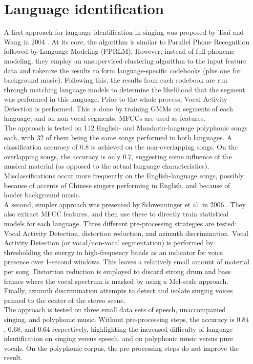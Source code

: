 \section{Language identification}
A first approach for language identification in singing was proposed by Tsai and Wang in 2004 \cite{tsai_wang}. At its core, the algorithm is similar to Parallel Phone Recognition followed by Language Modeling (PPRLM). However, instead of full phoneme modeling, they employ an unsupervised clustering algorithm to the input feature data and tokenize the results to form language-specific codebooks (plus one for background music). Following this, the results from each codebook are run through matching language models to determine the likelihood that the segment was performed in this language. Prior to the whole process, Vocal Activity Detection is performed. This is done by training GMMs on segments of each language, and on non-vocal segments. MFCCs are used as features.\\
The approach is tested on 112 English- and Mandarin-language polyphonic songs each, with 32 of them being the same songs performed in both languages. A classification accuracy of $0.8$ is achieved on the non-overlapping songs. On the overlapping songs, the accuracy is only $0.7$, suggesting some influence of the musical material (as opposed to the actual language characteristics). Misclassifications occur more frequently on the English-language songs, possibly because of accents of Chinese singers performing in English, and because of louder background music.\\

A second, simpler approach was presented by Schwenninger et al. in 2006 \cite{schwenninger}. They also extract MFCC features, and then use these to directly train statistical models for each language. Three different pre-processing strategies are tested: Vocal Activity Detection, distortion reduction, and azimuth discrimination. Vocal Activity Detection (or vocal/non-vocal segmentation) is performed by thresholding the energy in high-frequency bands as an indicator for voice presence over 1-second windows. This leaves a relatively small amount of material per song. Distortion reduction is employed to discard strong drum and bass frames where the vocal spectrum is masked by using a Mel-scale approach. Finally, azimuth discrimination attempts to detect and isolate singing voices panned to the center of the stereo scene.\\
The approach is tested on three small data sets of speech, unaccompanied singing, and polyphonic music. Without pre-processing steps, the accuracy is $0.84$, $0.68$, and $0.64$ respectively, highlighting the increased difficulty of language identification on singing versus speech, and on polyphonic music versus pure vocals. On the polyphonic corpus, the pre-processing steps do not improve the result.\\

